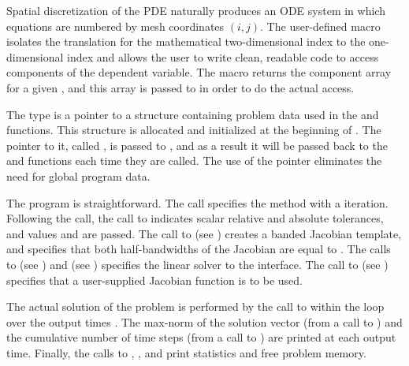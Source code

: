Spatial discretization of the PDE naturally produces an ODE system in
which equations are numbered by mesh coordinates $(i,j)$. The
user-defined macro  isolates the translation for the
mathematical two-dimensional index to the one-dimensional
 index and allows the user to write clean, readable code
to access components of the dependent variable.  The 
macro returns the component array for a given , and this
array is passed to  in order to do the actual 
access.

The type  is a pointer to a structure containing problem
data used in the  and  functions.  This structure is
allocated and initialized at the beginning of . The pointer
to it, called , is passed to , and as a
result it will be passed back to the  and  functions
each time they are called.  The use of the  pointer
eliminates the need for global program data.

The  program is straightforward.  The  call specifies
the  method with a  iteration. Following the
 call, the call to  indicates scalar
relative and absolute tolerances, and values  and  are passed.
The call to  (see ) creates a
banded {\sunmatrix} Jacobian template, and specifies that both
half-bandwidths of the Jacobian are equal to .  The calls to
 (see ) and
 (see ) specifies
the {\sunlinsolband} linear solver to the {\cvls} interface.
The call to  (see ) specifies
that a user-supplied Jacobian function  is to be used.

The actual solution of the problem is performed by
the call to  within the loop over the output times .
The max-norm of the solution vector (from a call to ) and
the cumulative number of time steps (from a call to ) are
printed at each output time. Finally, the calls to ,
, and  print statistics and free problem memory.


